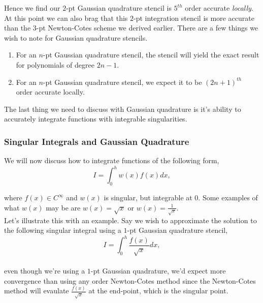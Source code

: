\documentclass[paper=a4, fontsize=11pt]{scrartcl} %
\numberwithin{equation}{section} %
\numberwithin{figure}{section} %
\numberwithin{table}{section} %
\begin{document}
\begin{itemize}
 Hence we find our $2$-pt Gaussian quadrature stencil is $5^{th}$ order accurate \emph{locally}. At this point we can also brag that this $2$-pt integration stencil is more accurate than the $3$-pt Newton-Cotes scheme we derived earlier. There are a few things we wish to note for Gaussian quadrature stencils.\\
 
 \begin{enumerate}
 \item For an $n$-pt Gaussian quadrature stencil, the stencil will yield the exact result for polynomials of degree $2n-1$.
 \item For an $n$-pt Gaussian quadrature stencil, we expect it to be $(2n+1)^{th}$ order accurate locally. 
 \end{enumerate}
 
 \end{itemize}

The last thing we need to discuss with Gaussian quadrature is it's ability to accurately integrate functions with integrable singularities. \\




%
%
%
%
%
%
\subsubsection{Singular Integrals and Gaussian Quadrature}

We will now discuss how to integrate functions of the following form, \\$$I = \int_0^h w(x) f(x) dx,$$

where $f(x)\in C^{\infty}$ and $w(x)$ is singular, but integrable at 0. Some examples of what $w(x)$ may be are $w(x) = \sqrt{x}$ or $w(x)=\frac{1}{\sqrt{x}}.$\\

Let's illustrate this with an example. Say we wish to approximate the solution to the following singular integral using a $1$-pt Gaussian quadrature stencil,\\

 $$I = \int_0^h \frac{f(x)}{\sqrt{x}} dx,$$\\
 
 even though we're using a $1$-pt Gaussian quadrature, we'd expect more convergence than using any order Newton-Cotes method since the Newton-Cotes method will evaulate $\frac{f(x)}{\sqrt{x}}$ at the end-point, which is the singular point. \\
 
\end{document}
